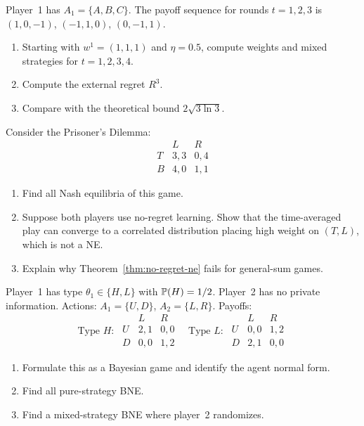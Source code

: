 \documentclass[11pt,a4paper]{article}
\begin{document}
\begin{exercise}
\label{ex:mwu-comp}
Player~1 has $A_1 = \{A,B,C\}$. The payoff sequence for rounds
$t = 1,2,3$ is $(1,0,-1)$, $(-1,1,0)$, $(0,-1,1)$.
\begin{enumerate}[label=(\alph*)]
    \item Starting with $w^1 = (1,1,1)$ and $\eta = 0.5$, compute
    weights and mixed strategies for $t = 1, 2, 3, 4$.
    \item Compute the external regret $R^3$.
    \item Compare with the theoretical bound $2\sqrt{3\ln 3}$.
\end{enumerate}
\end{exercise}

\begin{exercise}
\label{ex:no-regret-general}
Consider the Prisoner's Dilemma:
\[
\begin{array}{c|cc}
  & L & R \\ \hline
T & 3,3 & 0,4 \\
B & 4,0 & 1,1
\end{array}
\]
\begin{enumerate}[label=(\alph*)]
    \item Find all Nash equilibria of this game.
    \item Suppose both players use no-regret learning. Show that the
    time-averaged play can converge to a correlated distribution
    placing high weight on $(T,L)$, which is not a NE.
    \item Explain why Theorem~\ref{thm:no-regret-ne} fails for
    general-sum games.
\end{enumerate}
\end{exercise}

\begin{exercise}
\label{ex:bne-2x2}
Player~1 has type $\theta_1 \in \{H,L\}$ with $\mathbb{P}(H) = 1/2$.
Player~2 has no private information. Actions: $A_1 = \{U,D\}$,
$A_2 = \{L,R\}$. Payoffs:
\[
\text{Type } H: \;
\begin{array}{c|cc} & L & R \\ \hline U & 2,1 & 0,0 \\ D & 0,0 & 1,2
\end{array}
\quad
\text{Type } L: \;
\begin{array}{c|cc} & L & R \\ \hline U & 0,0 & 1,2 \\ D & 2,1 & 0,0
\end{array}
\]
\begin{enumerate}[label=(\alph*)]
    \item Formulate this as a Bayesian game and identify the agent
    normal form.
    \item Find all pure-strategy BNE.
    \item Find a mixed-strategy BNE where player~2 randomizes.
\end{enumerate}
\end{exercise}
\end{document}
